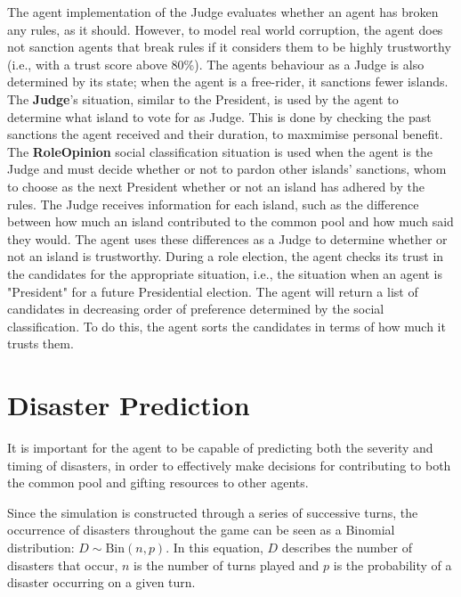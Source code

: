 The agent implementation of the Judge evaluates whether an agent has broken any rules, as it should. However, to model real world corruption, the agent does not sanction agents that break rules if it considers them to be highly trustworthy (i.e., with a trust score above 80\%). The agents behaviour as a Judge is also determined by its state; when the agent is a free-rider, it sanctions fewer islands. The \textbf{Judge}'s situation, similar to the President, is used by the agent to determine what island to vote for as Judge. This is done by checking the past sanctions the agent received and their duration, to maxmimise personal benefit. The \textbf{RoleOpinion} social classification situation is used when the agent is the Judge and must decide whether or not to pardon other islands' sanctions, whom to choose as the next President whether or not an island has adhered by the rules. The Judge receives information for each island, such as the difference between how much an island contributed to the common pool and how much said they would. The agent uses these differences as a Judge to determine whether or not an island is trustworthy. During a role election, the agent checks its trust in the candidates for the appropriate situation, i.e., the situation when an agent is "President" for a future Presidential election. The agent will return a list of candidates in decreasing order of preference determined by the social classification. To do this, the agent sorts the candidates in terms of how much it trusts them.

\section{Disaster Prediction}
It is important for the agent to be capable of predicting both the severity and timing of disasters, in order to effectively make decisions for contributing to both the common pool and gifting resources to other agents.

Since the simulation is constructed through a series of successive turns, the occurrence of disasters throughout the game can be seen as a Binomial distribution: $D \sim \text{Bin}(n,p)$. In this equation, $D$ describes the number of disasters that occur, $n$ is the number of turns played and $p$ is the probability of a disaster occurring on a given turn.

